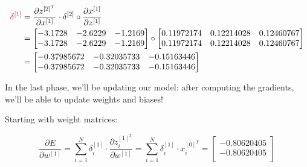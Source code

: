 \documentclass[12pt]{article}
\begin{document}
\begin{enumerate}[leftmargin=\labelsep]
        \begin{equation*}
          \begin{aligned}
            \textcolor{purple}{\delta^{[1]}} & = \frac{\partial z^{[2]^T}}{\partial x^{[1]}} \cdot \delta^{[2]} \circ \frac{\partial x^{[1]}}{\partial z^{[1]}} \\
                                             & = \begin{bmatrix}
                                                   -3.1728 & -2.6229 & -1.2169 \\
                                                   -3.1728 & -2.6229 & -1.2169 \\
                                                 \end{bmatrix} \circ \begin{bmatrix}
                                                                       0.11972174 & 0.12214028 & 0.12460767 \\
                                                                       0.11972174 & 0.12214028 & 0.12460767 \\
                                                                     \end{bmatrix}                                                       \\
                                             & = \begin{bmatrix}
                                                   -0.37985672 & -0.32035733 & -0.15163446 \\
                                                   -0.37985672 & -0.32035733 & -0.15163446 \\
                                                 \end{bmatrix}
          \end{aligned}
        \end{equation*}

        In the last phase, we'll be updating our model: after computing the gradients,
        we'll be able to update weights and biases!

        Starting with weight matrices:

        \begin{equation*}
          \frac{\partial E}{\partial w^{[1]}} = \sum_{i=1}^N \delta_i^{[1]} \cdot
          \frac{\partial z_i^{[1]^T}}{\partial w^{[1]}}
          = \sum_{i=1}^N \delta_i^{[1]} \cdot x_i^{[0]^T}
          = \begin{bmatrix}
            -0.80620405 \\
            -0.80620405 \\
          \end{bmatrix}
        \end{equation*}


\end{enumerate}
\end{document}
